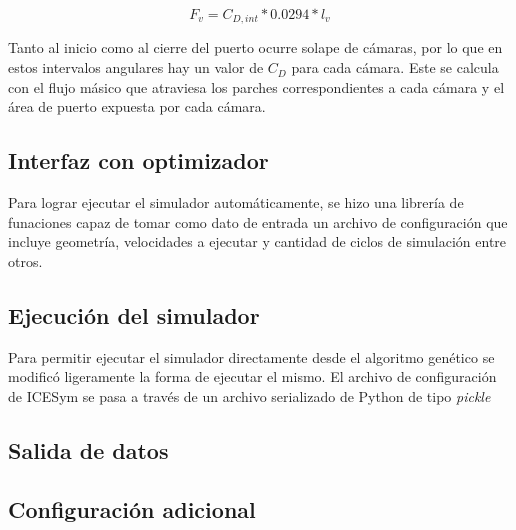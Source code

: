 \begin{equation}\label{eq:fv}
    F_v = C_{D,int}*0.0294*l_v
\end{equation}


%
Tanto al inicio como al cierre del puerto ocurre solape de cámaras, por lo que
en estos intervalos angulares hay un valor de $C_D$ para cada cámara.
%
Este se calcula con el flujo másico que atraviesa los parches correspondientes
a cada cámara y el área de puerto expuesta por cada cámara.

\subsection{Interfaz con optimizador}
%
Para lograr ejecutar el simulador automáticamente, se hizo una librería de
funaciones capaz de tomar como dato de entrada un archivo de configuración que
incluye geometría, velocidades a ejecutar y cantidad de ciclos de simulación
entre otros.
%



\subsection{Ejecución del simulador}
%
Para permitir ejecutar el simulador directamente desde el algoritmo genético
se modificó ligeramente la forma de ejecutar el mismo.
%
El archivo de configuración de ICESym se pasa a través de un archivo
serializado de Python de tipo \emph{pickle}

\subsection{Salida de datos}
\subsection{Configuración adicional}
